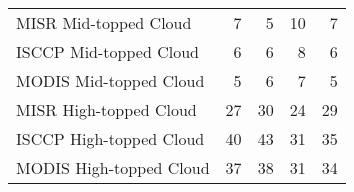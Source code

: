 \begin{tabular}{lrrrr}
   MISR Mid-topped Cloud &                        7 &                        5 &                       10 &                        7 \\
  ISCCP Mid-topped Cloud &                        6 &                        6 &                        8 &                        6 \\
  MODIS Mid-topped Cloud &                        5 &                        6 &                        7 &                        5 \\
  MISR High-topped Cloud &                       27 &                       30 &                       24 &                       29 \\
 ISCCP High-topped Cloud &                       40 &                       43 &                       31 &                       35 \\
 MODIS High-topped Cloud &                       37 &                       38 &                       31 &                       34 \\ \hline
\end{tabular}
